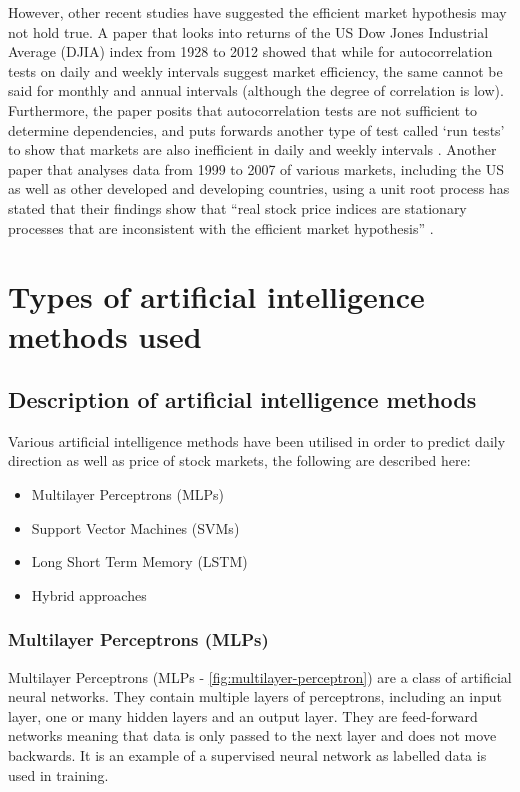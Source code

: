 However, other recent studies have suggested the efficient market hypothesis may not hold true. A paper that looks into returns of the US Dow Jones Industrial Average (DJIA) index from 1928 to 2012 showed that while for autocorrelation tests on daily and weekly intervals suggest market efficiency, the same cannot be said for monthly and annual intervals (although the degree of correlation is low). Furthermore, the paper posits that autocorrelation tests are not sufficient to determine dependencies, and puts forwards another type of test called `run tests' to show that markets are also inefficient in daily and weekly intervals \parencite{sewell_2012}. Another paper that analyses data from 1999 to 2007 of various markets, including the US as well as other developed and developing countries, using a unit root process has stated that their findings show that ``real stock price indices are stationary processes that are inconsistent with the efficient market hypothesis'' \parencite[1]{LEE201049}.




\section{Types of artificial intelligence methods used}

\subsection{Description of artificial intelligence methods}
Various artificial intelligence methods have been utilised in order to predict daily direction as well
as price of stock markets, the following are described here:
\begin{itemize}
    \item Multilayer Perceptrons (MLPs)
    \item Support Vector Machines (SVMs)
    \item Long Short Term Memory (LSTM)
    \item Hybrid approaches
\end{itemize}

\subsubsection{Multilayer Perceptrons (MLPs)}
Multilayer Perceptrons (MLPs - \autoref{fig:multilayer-perceptron}) are a class of artificial neural networks. They contain multiple layers
of perceptrons, including an input layer, one or many hidden layers and an output layer. They are
feed-forward networks meaning that data is only passed to the next layer and does not move backwards.
It is an example of a supervised neural network as labelled data is used in training.

